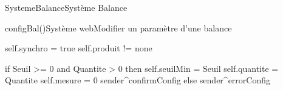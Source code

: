 \begin{OM}{SystemeBalance}{Système Balance}
    \begin{OMOperation}{configBal()}{Système web}{Modifier un paramètre d'une balance}
        \begin{OMMessages}
        \end{OMMessages}
        \begin{OMPre}
            self.synchro = true
            self.produit != none
        \end{OMPre}
        \begin{OMPost}
            if Seuil >= 0 and Quantite > 0 then
            self.seuilMin = Seuil
            self.quantite = Quantite
            self.mesure = 0
            sender^confirmConfig
            else
            sender^errorConfig
        \end{OMPost}
    \end{OMOperation}
\end{OM}

